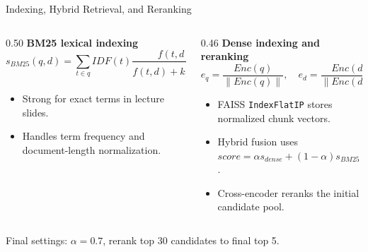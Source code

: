 \documentclass[10pt,aspectratio=169]{beamer}
\newcommand{\muted}[1]{{\scriptsize\textcolor{Muted}{#1}}}
\begin{document}
\begin{frame}{Indexing, Hybrid Retrieval, and Reranking}
    \begin{columns}[T,totalwidth=\textwidth]
        \begin{column}{0.50\textwidth}
            \textbf{BM25 lexical indexing}
            \scriptsize
            \[
            s_{BM25}(q,d)=\sum_{t\in q} IDF(t)
            \frac{f(t,d)(k_1+1)}
            {f(t,d)+k_1(1-b+b\frac{|d|}{avgdl})}
            \]
            \normalsize
            \begin{itemize}
                \item Strong for exact terms in lecture slides.
                \item Handles term frequency and document-length normalization.
            \end{itemize}
        \end{column}
        \begin{column}{0.46\textwidth}
            \textbf{Dense indexing and reranking}
            \scriptsize
            \[
                e_q=\frac{Enc(q)}{\|Enc(q)\|}, \quad
                e_d=\frac{Enc(d)}{\|Enc(d)\|}, \quad
                s_{dense}=e_q^\top e_d
            \]
            \normalsize
            \begin{itemize}
                \item FAISS \texttt{IndexFlatIP} stores normalized chunk vectors.
                \item Hybrid fusion uses $score=\alpha s_{dense}+(1-\alpha)s_{BM25}$.
                \item Cross-encoder reranks the initial candidate pool.
            \end{itemize}
        \end{column}
    \end{columns}
    \vspace{0.4em}
    \centering
    \muted{Final settings: $\alpha=0.7$, rerank top 30 candidates to final top 5.}
\end{frame}
\end{document}
